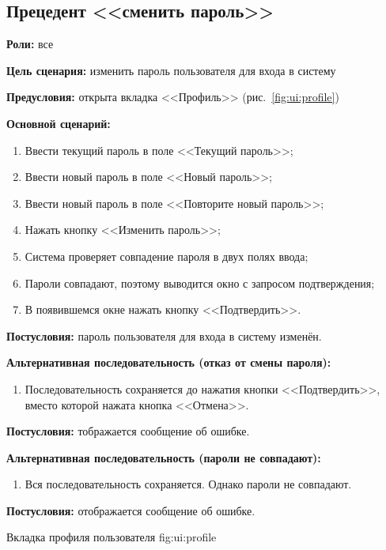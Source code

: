 \subsection{Прецедент <<сменить пароль>>}
\textbf{Роли:} все \par
\textbf{Цель сценария:} изменить пароль пользователя для входа в систему \par
\textbf{Предусловия:} открыта вкладка <<Профиль>> 
    (рис.~\ref{fig:ui:profile}) \par
\textbf{Основной сценарий:} 
\begin{enumerate}
    \item Ввести текущий пароль в поле <<Текущий пароль>>;
    \item Ввести новый пароль в поле <<Новый пароль>>;
    \item Ввести новый пароль в поле <<Повторите новый пароль>>;
    \item Нажать кнопку <<Изменить пароль>>;
    \item Система проверяет совпадение пароля в двух полях ввода;
    \item Пароли совпадают, поэтому выводится окно с запросом подтверждения;
    \item В появившемся окне нажать кнопку <<Подтвердить>>.
\end{enumerate} \par
\textbf{Постусловия:} пароль пользователя для входа в систему изменён. \par
\textbf{Альтернативная последовательность (отказ от смены пароля):} \par
\begin{enumerate}
    \item Последовательность сохраняется до нажатия кнопки <<Подтвердить>>, 
        вместо которой нажата кнопка <<Отмена>>.
\end{enumerate} \par
\textbf{Постусловия:} тображается сообщение об ошибке. \par
\textbf{Альтернативная последовательность (пароли не совпадают):} \par
\begin{enumerate}
    \item Вся последовательность сохраняется. Однако пароли не совпадают.
\end{enumerate} \par
\textbf{Постусловия:} отображается сообщение об ошибке. \par
{}
    {Вкладка профиля пользователя}
    {fig:ui:profile}


